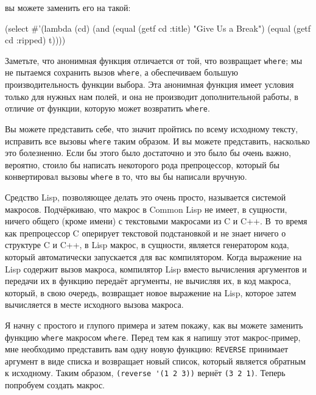 \noindent{}вы можете заменить его на такой:

\begin{myverb}
(select
 #'(lambda (cd)
     (and (equal (getf cd :title) "Give Us a Break")
          (equal (getf cd :ripped) t))))
\end{myverb}

Заметьте, что анонимная функция отличается от той, что возвращает \lstinline{where}; мы не
пытаемся сохранить вызов \lstinline{where}, а обеспечиваем большую производительность функции
выбора. Эта анонимная функция имеет условия только для нужных нам полей, и она не
производит дополнительной работы, в отличие от функции, которую может возвратить
\lstinline{where}.

Вы можете представить себе, что значит пройтись по всему исходному тексту, исправить все
вызовы \lstinline{where} таким образом. И вы можете представить, насколько это болезненно. Если
бы этого было достаточно и это было бы очень важно, вероятно, стоило бы написать
некоторого рода препроцессор, который бы конвертировал вызовы \lstinline{where} в то, что вы бы
написали вручную.

Средство Lisp, позволяющее делать это очень просто, называется системой
макросов. Подчёркиваю, что макрос в Common Lisp не имеет, в сущности, ничего общего (кроме
имени) с текстовыми макросами из C и C++. В~то время как препроцессор C оперирует
текстовой подстановкой и не знает ничего о структуре C и C++, в Lisp макрос, в сущности,
является генератором кода, который автоматически запускается для вас
компилятором. Когда
выражение на Lisp содержит вызов макроса, компилятор Lisp вместо вычисления аргументов и
передачи их в функцию передаёт аргументы, не вычисляя их, в код макроса, который, в свою
очередь, возвращает новое выражение на Lisp, которое затем вычисляется в месте исходного
вызова макроса.

Я начну с простого и глупого примера и затем покажу, как вы можете заменить функцию
\lstinline{where} макросом \lstinline{where}. Перед тем как я напишу этот макрос-пример, мне
необходимо представить вам одну новую функцию: \lstinline{REVERSE} принимает аргумент в виде
списка и возвращает новый список, который является обратным к исходному. Таким образом,
\lstinline{(reverse '(1 2 3))} вернёт \lstinline{(3 2 1)}. Теперь попробуем создать макрос.

